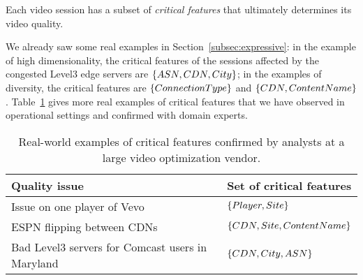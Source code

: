 \begin{insight}
\vspace{0.1cm}
Each video session has a subset of {\em critical features} that ultimately determines its video quality.
\vspace{-0.2cm}
\end{insight}

We already saw some real examples in 
Section~\ref{subsec:expressive}:
in the example of high dimensionality, the critical features 
of the sessions affected by the congested Level3 edge 
servers are $\{ASN, CDN, City\}$;
in the examples of diversity, the critical features are
$\{ConnectionType\}$ and $\{CDN,ContentName\}$.
Table~\ref{tab:bottleneck} gives more real examples 
of critical features that we have observed in operational 
settings and confirmed with domain experts.


\begin{table}[t!]
    \begin{tabular}{p{}|p{2in}}
    {\bf Quality issue} & {\bf Set of critical features} \\ \hline\hline

     Issue on one player of Vevo & $\{Player,Site\}$ \\ \hline
     ESPN flipping between CDNs  & $\{CDN,Site,ContentName\}$ \\ \hline
     Bad Level3 servers for Comcast users in Maryland& $\{CDN,City,ASN\}$ \\
    \end{tabular}
\caption{Real-world examples of critical features confirmed 
by analysts at a large video optimization vendor.}
\label{tab:bottleneck}
\end{table}


